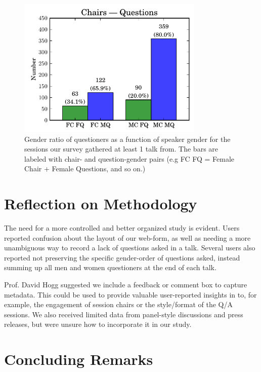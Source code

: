 \documentclass[iop]{emulateapj}
\begin{document}
\clearpage


\begin{figure}[!t]
\centering
\includegraphics[width=3.5in]{chairs_questions}
\caption{Gender ratio of questioners as a function of speaker gender for the sessions our survey gathered at least 1 talk from. The bars are labeled with chair- and question-gender pairs (e.g FC FQ = Female Chair + Female Questions, and so on.)}
\label{fig:chairs}
\end{figure}



\section{Reflection on Methodology}
The need for a more controlled and better organized study is evident. Users reported confusion about the layout of our web-form, as well as needing a more unambiguous way to record a lack of questions asked in a talk. Several users also reported not preserving the specific gender-order of questions asked, instead summing up all men and women questioners at the end of each talk.

Prof. David Hogg suggested we include a feedback or comment box to capture metadata. This could be used to provide valuable user-reported insights in to, for example, the engagement of session chairs or the style/format of the Q/A sessions. 
We also received limited data from panel-style discussions and press releases, but were unsure how to incorporate it in our study. 






\section{Concluding Remarks}
\end{document}

